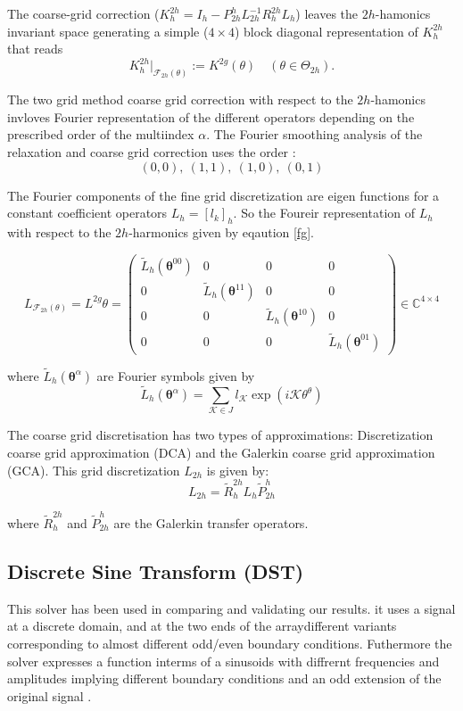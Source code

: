 \documentclass[12pt,a4paper]{article}
\begin{document}
	 \noindent The coarse-grid correction ($K_{h}^{2h} = I_{h} -  P_{2h}^{h}L_{2h}^{-1} R_{h}^{2h} L_{h} $) leaves the $2h$-hamonics invariant space generating a simple ($4\times4$) block diagonal representation of $K_{h}^{2h}$ that reads
	 $$K_{h}^{2h}|_{\mathcal{F}_{2h}(\theta)} := K^{2g} (\theta) \quad (\theta \in \Theta_{2h}).$$
	 
	 \noindent The two grid method coarse grid correction with respect to the $2h$-hamonics invloves 
	 Fourier representation of the different operators depending on the prescribed order of  the multiindex $\alpha$. The Fourier smoothing analysis of the relaxation and coarse grid correction uses the order :
	 $$(0,0),~(1,1),~(1,0),~(0,1)$$
	 
	 \noindent  The Fourier components of  the fine grid discretization are eigen functions for a constant coefficient operators $L_{h} = [l_{k}]_{h}$. So the Foureir representation of  $L_{h}$ with respect to the $2h$-harmonics given by eqaution \eqref{fg}.
	 
	 \begin{equation}
	 	 L_{\mathcal{F}_{2h}(\theta)} = L^{2g}\theta =\begin{pmatrix}
	 	\tilde{L}_{h}(\mathbf{\theta}^{00})& 0 & 0 & 0 \\
	 		0 &\tilde{L}_{h}^{~}(\mathbf{\theta}^{11}) & 0 & 0 \\
	 		0 & 0 & \tilde{L}_{h}^{~}(\mathbf{\theta}^{10}) & 0 \\
	 		0 & 0 & 0 & \tilde{L}_{h}^{~}(\mathbf{\theta}^{01})
	 	\end{pmatrix} \in \mathbb{C}^{4\times4}
 	\label{fg}
	 \end{equation}
	 
	  \noindent where  $\tilde{L}_{h}(\mathbf{\theta}^{\alpha})$ are Fourier symbols given by $$\tilde{L}_{h}(\mathbf{\theta}^{\alpha}) = \sum_{\mathcal{K} \in J} l_{\mathcal{K}}\exp(i\mathcal{K} \theta^{\theta})$$
	
	 \noindent The coarse grid discretisation has two types of approximations: Discretization coarse grid approximation (DCA) and the Galerkin coarse grid approximation (GCA). This grid discretization $L_{2h}$ is given by:
	 $$L_{2h} = \tilde{R}_{h}^{2h} L_{h} \tilde{P}_{2h}^{h} $$
	 
	\noindent where $\tilde{R}_{h}^{2h}$ and $\tilde{P}_{2h}^{h}$ are the Galerkin transfer operators.
	\subsection{Discrete Sine Transform (DST)}
	This solver has been used in comparing and validating our results. it uses a signal at a discrete domain, and at the two ends of the arraydifferent variants corresponding to almost different odd/even boundary conditions.  Futhermore the solver expresses a function interms of a sinusoids with diffrernt frequencies and amplitudes implying different boundary conditions and an odd extension of the original signal \cite{gupta1990fast}.
	
\end{document}
